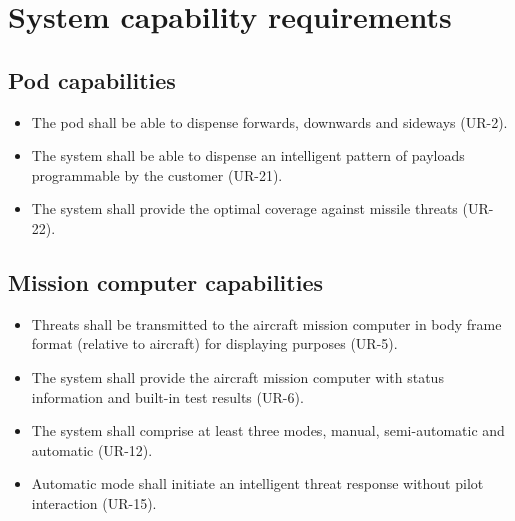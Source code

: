 \documentclass[Main]{subfiles}
\begin{document}
\section{System capability requirements}

\subsection{Pod capabilities}\label{pod}

\begin{itemize}
\item The pod shall be able to dispense forwards, downwards and sideways (UR-2).

\item The system shall be able to dispense an intelligent pattern of payloads programmable by the customer (UR-21).

\item The system shall provide the optimal coverage against missile threats (UR-22).

\end{itemize}

\subsection{Mission computer capabilities}

\begin{itemize}
\item Threats shall be transmitted to the aircraft mission computer in body frame format (relative to aircraft) for displaying purposes (UR-5).

\item The system shall provide the aircraft mission computer with status information and built-in test results (UR-6).

\item The system shall comprise at least three modes, manual, semi-automatic and automatic (UR-12).

\item Automatic mode shall initiate an intelligent threat response without pilot interaction (UR-15).

\end{itemize}
\end{document}
